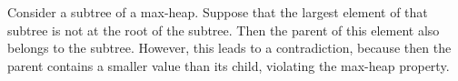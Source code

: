Consider a subtree of a max-heap.
Suppose that the largest element of that subtree is not at the root of the subtree.
Then the parent of this element also belongs to the subtree.
However, this leads to a contradiction, because then the parent contains a smaller value than its child, violating the max-heap property.
